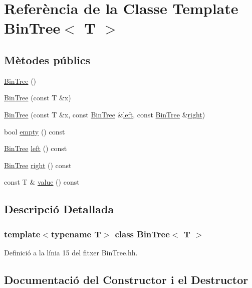\hypertarget{class_bin_tree}{}\section{Referència de la Classe Template Bin\+Tree$<$ T $>$}
\label{class_bin_tree}
\subsection*{Mètodes públics}
\begin{DoxyCompactItemize}
\item 
\hyperlink{class_bin_tree_a47eef22d29cd023449d97c073c08e5b6}{Bin\+Tree} ()
\item 
\hyperlink{class_bin_tree_a1ab686e0bcf990093ff91fe71744c1a4}{Bin\+Tree} (const T \&x)
\item 
\hyperlink{class_bin_tree_adb7eeff76d08130c943b36af215eb521}{Bin\+Tree} (const T \&x, const \hyperlink{class_bin_tree}{Bin\+Tree} \&\hyperlink{class_bin_tree_a82108db4c1b08d1f111027788c196d4e}{left}, const \hyperlink{class_bin_tree}{Bin\+Tree} \&\hyperlink{class_bin_tree_aff8e96651b27284c329667b5ad3e4d0b}{right})
\item 
bool \hyperlink{class_bin_tree_a74cda259ba5c25b8ee38ed4dc33e4fad}{empty} () const
\item 
\hyperlink{class_bin_tree}{Bin\+Tree} \hyperlink{class_bin_tree_a82108db4c1b08d1f111027788c196d4e}{left} () const
\item 
\hyperlink{class_bin_tree}{Bin\+Tree} \hyperlink{class_bin_tree_aff8e96651b27284c329667b5ad3e4d0b}{right} () const
\item 
const T \& \hyperlink{class_bin_tree_a734e785b089c87b49187ee7c58edf5f3}{value} () const
\end{DoxyCompactItemize}


\subsection{Descripció Detallada}
\subsubsection*{template$<$typename T$>$\newline
class Bin\+Tree$<$ T $>$}



Definició a la línia 15 del fitxer Bin\+Tree.\+hh.



\subsection{Documentació del Constructor i el Destructor}
\mbox{\label{class_bin_tree_a47eef22d29cd023449d97c073c08e5b6}} 

